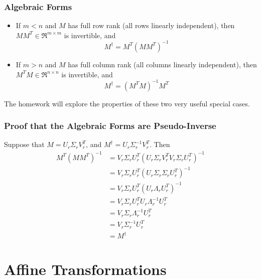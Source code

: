 \documentclass{beamer}
\begin{document}
\begin{frame}
  \frametitle{Algebraic Forms}

  \begin{itemize}
  \item If $m<n$ and $M$ has full row rank (all rows linearly
    independent), then $MM^T\in\Re^{m\times m}$ is invertible, and
    \begin{displaymath}
      M^\dag = M^T(MM^T)^{-1}
    \end{displaymath}
  \item If $m>n$ and $M$ has full column rank (all columns linearly
    independent), then $M^TM\in\Re^{n\times n}$ is invertible, and
    \begin{displaymath}
      M^\dag = (M^TM)^{-1} M^T
    \end{displaymath}
  \end{itemize}
  The homework will explore the properties of these two very useful special cases.
\end{frame}

\begin{frame}
  \frametitle{Proof that the Algebraic Forms are Pseudo-Inverse}

  Suppose that $M=U_r\Sigma_r V_r^T$, and $M^\dag = U_r\Sigma_r^{-1}
  V_r^T$.  Then
  \begin{align*}
    M^T(MM^T)^{-1} &= V_r\Sigma_rU_r^T(U_r\Sigma_rV_r^TV_r\Sigma_rU_r^T)^{-1}\\
    &= V_r\Sigma_rU_r^T(U_r\Sigma_r\Sigma_rU_r^T)^{-1}\\
    &= V_r\Sigma_rU_r^T(U_r\Lambda_rU_r^T)^{-1}\\
    &= V_r\Sigma_rU_r^TU_r\Lambda_r^{-1}U_r^T\\
    &= V_r\Sigma_r\Lambda_r^{-1}U_r^T\\
    &= V_r\Sigma_r^{-1}U_r^T\\
    &= M^\dag
  \end{align*}
\end{frame}

\section{Affine Transformations}
\setcounter{subsection}{1}
\end{document}
